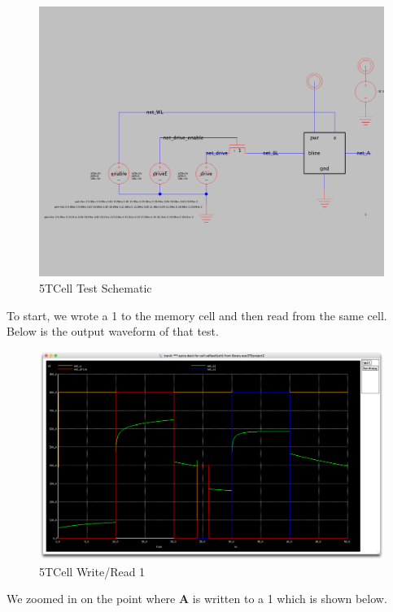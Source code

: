 \documentclass[a4paper]{article}
\begin{document}
\begin{figure}[H]
	\centering
	\includegraphics[scale=0.2]{5TCellTest}
	\caption{5TCell Test Schematic}
	\label{fig:5TCellTest}
\end{figure}

 To start, we wrote a 1 to the memory cell and then read from the same cell. Below is the output waveform of that test.\\
 
 \begin{figure}[H]
	\centering
	\includegraphics[scale=0.12]{5TWR1}
	\caption{5TCell Write/Read 1}
	\label{fig:5TWR1}
\end{figure}
We zoomed in on the point where \textbf{A} is written to a 1 which is shown below.\\
\end{document}
